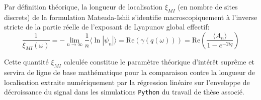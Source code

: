 Par définition théorique, la longueur de localisation $\xi_{MI}$ (en nombre de sites discrets) de la formulation Matsuda-Ishii s'identifie macroscopiquement à l'inverse stricte de la partie réelle de l'exposant de Lyapunov global effectif:
\begin{equation}
    \frac{1}{\xi_{MI}(\omega)} = -\lim_{n \to \infty} \frac{1}{n} \langle \ln |\psi_n| \rangle = \text{Re} \left( \gamma(q(\omega)) \right) = \text{Re} \left( \frac{\langle A_n \rangle}{1 - e^{-2iq}} \right)
\end{equation}

Cette quantité $\xi_{MI}$ calculée constitue le paramètre théorique d'intérêt suprême et servira de ligne de base mathématique pour la comparaison contre la longueur de localisation extraite numériquement par la régression linéaire sur l'enveloppe de décroissance du signal dans les simulations \verb|Python| du travail de thèse associé.
